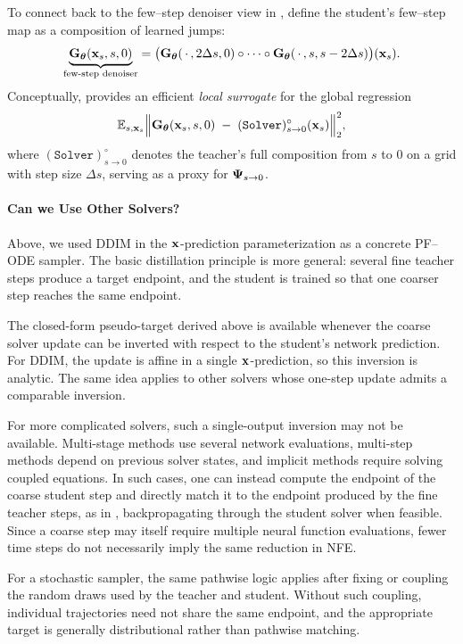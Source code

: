 To connect back to the few–step denoiser view in , define
the student’s few–step map as a composition of learned jumps:
\[
\underbrace{{\mathbf{G}}_{{\bm{\theta}}}({\mathbf{x}}_s, s, 0)}_{\text{few-step denoiser}}
=
\big({\mathbf{G}}_{{\bm{\theta}}}(\,\cdot\,, 2\Delta s, 0)\circ\cdots\circ {\mathbf{G}}_{{\bm{\theta}}}(\,\cdot\,, s, s-2\Delta s)\big)({\mathbf{x}}_s).
\]
Conceptually,  provides an efficient \emph{local surrogate} for the
global regression
\[
\mathbb{E}_{s,{\mathbf{x}}_s}\Big\|{\mathbf{G}}_{{\bm{\theta}}}({\mathbf{x}}_s,s,0)\;-\;(\mathtt{Solver})^{\circ}_{s\to 0}({\mathbf{x}}_s)\Big\|_2^2,
\]
where $(\mathtt{Solver})^{\circ}_{s\to 0}$ denotes the teacher’s full
composition from $s$ to $0$ on a grid with step size $\Delta s$, serving as a
proxy for ${\bm{\Psi}}_{s\to 0}$.

\paragraph{Can we Use Other Solvers?}
Above, we used DDIM in the ${\mathbf{x}}$-prediction parameterization as a concrete
PF--ODE sampler. The basic distillation principle is more general: several
fine teacher steps produce a target endpoint, and the student is trained so
that one coarser step reaches the same endpoint.

The closed-form pseudo-target derived above is available whenever the coarse
solver update can be inverted with respect to the student's network prediction.
For DDIM, the update is affine in a single ${\mathbf{x}}$-prediction, so this inversion
is analytic. The same idea applies to other solvers whose one-step update admits
a comparable inversion.

For more complicated solvers, such a single-output inversion may not be
available. Multi-stage methods use several network evaluations, multi-step
methods depend on previous solver states, and implicit methods require solving
coupled equations. In such cases, one can instead compute the endpoint of the
coarse student step and directly match it to the endpoint produced by the fine
teacher steps, as in , backpropagating through the student
solver when feasible. Since a coarse step may itself require multiple neural
function evaluations, fewer time steps do not necessarily imply the same
reduction in NFE.

For a stochastic sampler, the same pathwise logic applies after fixing or
coupling the random draws used by the teacher and student. Without such
coupling, individual trajectories need not share the same endpoint, and the
appropriate target is generally distributional rather than pathwise matching.







